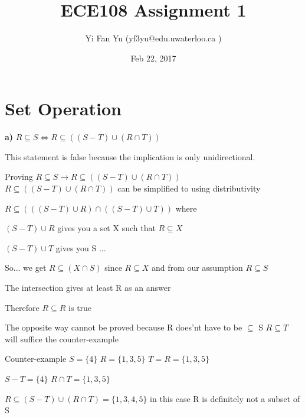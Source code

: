 \documentclass[12pts,A4]{article}
\begin{document}
\title{ECE108 Assignment 1}
\author{Yi Fan Yu (yf3yu@edu.uwaterloo.ca ) }
\date{Feb 22, 2017}
\maketitle


\section{Set Operation}




\begin{flushleft}
    
    \textbf{a)}
    $R \subseteq  S \iff R \subseteq  ((S - T) \cup (R \cap T))$ 


    This statement is false because the implication is only unidirectional. 
\bigskip



Proving $R \subseteq  S \rightarrow R \subseteq  ((S - T) \cup (R \cap T)) $ \\ 



$R \subseteq  ((S - T) \cup (R \cap T))$ can be simplified to using distributivity
\bigskip

$R \subseteq ( (( S - T )\cup R )\cap( ( S - T )\cup T) ) $ where


$( S - T )\cup R$ gives you a set X such that $R \subseteq X$

$ ( S - T )\cup T$  gives you S ...
\bigskip

	So... we get $ R \subseteq  (X \cap S) $ 
since $R \subseteq X$ and from our assumption $R \subseteq S$

The intersection gives at least R as an answer

Therefore
$R \subseteq  R$ is true 
 
\bigskip
The opposite way cannot be proved because R does'nt have to be  $\subseteq$ S
$R \subseteq  T$ will suffice the counter-example
\bigskip

Counter-example $ S = \{4\}$
$R = \{1,3,5\}$
$T = R = \{1,3,5\}$

$S-T = \{4\}$
$R \cap T = \{1,3,5\}$

$ R \subseteq (S - T) \cup (R \cap T) = \{1,3,4,5\}$ 
in this case R is definitely not a subset of S



\end{flushleft}

\pagebreak
\end{document}
